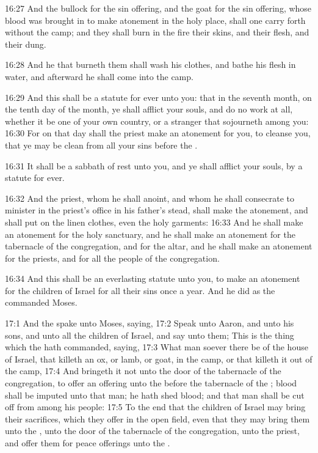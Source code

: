 16:27 And the bullock for the sin offering, and the goat for the sin
offering, whose blood was brought in to make atonement in the holy
place, shall one carry forth without the camp; and they shall burn in
the fire their skins, and their flesh, and their dung.

16:28 And he that burneth them shall wash his clothes, and bathe his
flesh in water, and afterward he shall come into the camp.

16:29 And this shall be a statute for ever unto you: that in the
seventh month, on the tenth day of the month, ye shall afflict your
souls, and do no work at all, whether it be one of your own country,
or a stranger that sojourneth among you: 16:30 For on that day shall
the priest make an atonement for you, to cleanse you, that ye may be
clean from all your sins before the \LORD.

16:31 It shall be a sabbath of rest unto you, and ye shall afflict
your souls, by a statute for ever.

16:32 And the priest, whom he shall anoint, and whom he shall
consecrate to minister in the priest's office in his father's stead,
shall make the atonement, and shall put on the linen clothes, even the
holy garments: 16:33 And he shall make an atonement for the holy
sanctuary, and he shall make an atonement for the tabernacle of the
congregation, and for the altar, and he shall make an atonement for
the priests, and for all the people of the congregation.

16:34 And this shall be an everlasting statute unto you, to make an
atonement for the children of Israel for all their sins once a year.
And he did as the \LORD commanded Moses.

17:1 And the \LORD spake unto Moses, saying, 17:2 Speak unto Aaron, and
unto his sons, and unto all the children of Israel, and say unto them;
This is the thing which the \LORD hath commanded, saying, 17:3 What man
soever there be of the house of Israel, that killeth an ox, or lamb,
or goat, in the camp, or that killeth it out of the camp, 17:4 And
bringeth it not unto the door of the tabernacle of the congregation,
to offer an offering unto the \LORD before the tabernacle of the \LORD;
blood shall be imputed unto that man; he hath shed blood; and that man
shall be cut off from among his people: 17:5 To the end that the
children of Israel may bring their sacrifices, which they offer in the
open field, even that they may bring them unto the \LORD, unto the door
of the tabernacle of the congregation, unto the priest, and offer them
for peace offerings unto the \LORD.

